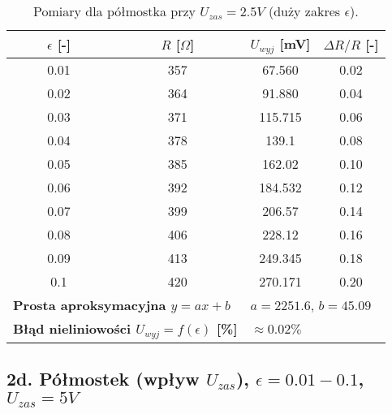 \documentclass[12pt, a4paper]{article}
\begin{document}
	\begin{table}[H]
		\centering
		\caption{Pomiary dla półmostka przy $U_{zas} = 2.5 V$ (duży zakres $\epsilon$).}
		\begin{tabular}{cccc}
			\toprule
			$\epsilon$ [-] & $R$ [$\Omega$] & $U_{wyj}$ [mV] & $\Delta R/R$ [-] \\
			\midrule
			0.01 & 357 & 67.560 & 0.02 \\
			0.02 & 364 & 91.880 & 0.04 \\
			0.03 & 371 & 115.715 & 0.06 \\
			0.04 & 378 & 139.1 & 0.08 \\
			0.05 & 385 & 162.02 & 0.10 \\
			0.06 & 392 & 184.532 & 0.12 \\
			0.07 & 399 & 206.57 & 0.14 \\
			0.08 & 406 & 228.12 & 0.16 \\
			0.09 & 413 & 249.345 & 0.18 \\
			0.1 & 420 & 270.171 & 0.20 \\
			\midrule
			\multicolumn{2}{l}{\textbf{Prosta aproksymacyjna $y = ax + b$}} & \multicolumn{2}{l}{$a = 2251.6$, $b = 45.09$} \\
			\multicolumn{2}{l}{\textbf{Błąd nieliniowości $U_{wyj} = f(\epsilon)$ [\%]}} & \multicolumn{2}{l}{$\approx 0.02 \%$} \\
			\bottomrule
		\end{tabular}
	\end{table}
	
	\subsection{2d. Półmostek (wpływ $U_{zas}$), $\epsilon = 0.01-0.1$, $U_{zas} = 5 V$}
	
\end{document}
